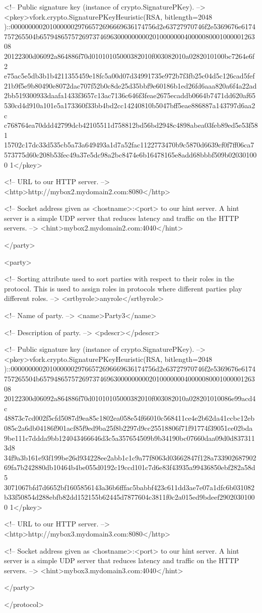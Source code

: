       <!-- Public signature key (instance of crypto.SignaturePKey). -->
      <pkey>vfork.crypto.SignaturePKeyHeuristic(RSA, bitlength=2048
)::00000000020100000029766572696669636174756d2e63727970746f2e5369676e6174
757265504b657948657572697374696300000000020100000004000008000100000126308
20122300d06092a864886f70d01010105000382010f003082010a0282010100bc7264e6f2
e75ac5e5db3b1b4211355459e18fc5a00d07d34991735e972b7f3fb25c04d5c126cad5fef
21b9f5e9b80490e8072dac707f52b0c8de25d35bbf9e60186b1ed26fd6aaa820a6f4a22ad
2bb519300933daafa1433f3657c13ac7136c646f3feae2675ecaddb0664b7471dd620af65
530cd4d910a101e5a173360f33bb4bd2cc14240810b5047bff5eae886887a143797d6aa2c
c768764ea70ddd42799dcb42105511d758812bd56bd2948c4898abea03feb89ed5e53f581
15702c17dc33d535cb5a73a649493a1d7a52fac1122773470b9c5870d6639cf0f7ff06ca7
573775d60c208b53fec49a37e5dc98a2bc8474e6b16478165e8add68bbbf509b020301000
1</pkey>

      <!-- URL to our HTTP server. -->
      <http>http://mybox2.mydomain2.com:8080</http>

      <!-- Socket address given as <hostname>:<port> to our hint server. 
           A hint server is a simple UDP server that reduces latency and 
           traffic on the HTTP servers. -->
      <hint>mybox2.mydomain2.com:4040</hint>

   </party>

   <party>

      <!-- Sorting attribute used to sort parties with respect to their 
           roles in the protocol. This is used to assign roles in 
           protocols where different parties play different roles. -->
      <srtbyrole>anyrole</srtbyrole>

      <!-- Name of party. -->
      <name>Party3</name>

      <!-- Description of party. -->
      <pdescr></pdescr>

      <!-- Public signature key (instance of crypto.SignaturePKey). -->
      <pkey>vfork.crypto.SignaturePKeyHeuristic(RSA, bitlength=2048
)::00000000020100000029766572696669636174756d2e63727970746f2e5369676e6174
757265504b657948657572697374696300000000020100000004000008000100000126308
20122300d06092a864886f70d01010105000382010f003082010a028201010086e99acd4c
48873c7cd002f5cfd5087d9ea85c1802ea058e54f66010c568411ce4e2b62da41ccbc12eb
085c2a6db04186f901acf85f9ed9ba25f8b2297d9cc25518806f71f91774f39051ce02bda
9be111c7ddda9bb124043466646d3c5a357654509b9b34190bc07660daa09d0d8373113d8
34f9a3b161e93f199be26d934228ee2abb1c1c9a77f8063d03662847f128a733902687902
69fa7b242880db10464b4be055d0192c19ccd101c7d6e83f43935a99436850ebf282a58d5
3071067bfd7d6652bf1605856143a36b6fffac5babbf423c611dd3ae7e07a1dfc6b031082
b33f50854d288ebfb82dd152155b62445d7877604c3811f0c2a015ed9bdeef29020301000
1</pkey>

      <!-- URL to our HTTP server. -->
      <http>http://mybox3.mydomain3.com:8080</http>

      <!-- Socket address given as <hostname>:<port> to our hint server. 
           A hint server is a simple UDP server that reduces latency and 
           traffic on the HTTP servers. -->
      <hint>mybox3.mydomain3.com:4040</hint>

   </party>

</protocol>

